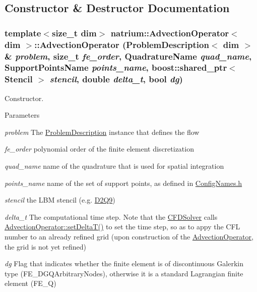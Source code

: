 \subsection{Constructor \& Destructor Documentation}
\hypertarget{classnatrium_1_1AdvectionOperator_a89843b1b14386e984a5dab59b0a602b4}{
\subsubsection[{AdvectionOperator}]{\setlength{\rightskip}{0pt plus 5cm}template$<$size\_\-t dim$>$ {\bf natrium::AdvectionOperator}$<$ dim $>$::{\bf AdvectionOperator} ({\bf ProblemDescription}$<$ dim $>$ \& {\em problem}, \/  size\_\-t {\em fe\_\-order}, \/  QuadratureName {\em quad\_\-name}, \/  SupportPointsName {\em points\_\-name}, \/  boost::shared\_\-ptr$<$ {\bf Stencil} $>$ {\em stencil}, \/  double {\em delta\_\-t}, \/  bool {\em dg})}}
\label{classnatrium_1_1AdvectionOperator_a89843b1b14386e984a5dab59b0a602b4}


Constructor. 
\begin{DoxyParams}{Parameters}
\item[{\em problem}]The \hyperlink{classnatrium_1_1ProblemDescription}{ProblemDescription} instance that defines the flow \item[{\em fe\_\-order}]polynomial order of the finite element discretization \item[{\em quad\_\-name}]name of the quadrature that is used for spatial integration \item[{\em points\_\-name}]name of the set of support points, as defined in \hyperlink{ConfigNames_8h_source}{ConfigNames.h} \item[{\em stencil}]the LBM stencil (e.g. \hyperlink{classnatrium_1_1D2Q9}{D2Q9}) \item[{\em delta\_\-t}]The computational time step. Note that the \hyperlink{classnatrium_1_1CFDSolver}{CFDSolver} calls \hyperlink{classnatrium_1_1AdvectionOperator_a640db5be4d4930198124fa57752167e5}{AdvectionOperator::setDeltaT()} to set the time step, so as to appy the CFL number to an already refined grid (upon construction of the \hyperlink{classnatrium_1_1AdvectionOperator}{AdvectionOperator}, the grid is not yet refined) \item[{\em dg}]Flag that indicates whether the finite element is of discontinuous Galerkin type (FE\_\-DGQArbitraryNodes), otherwise it is a standard Lagrangian finite element (FE\_\-Q) \end{DoxyParams}



